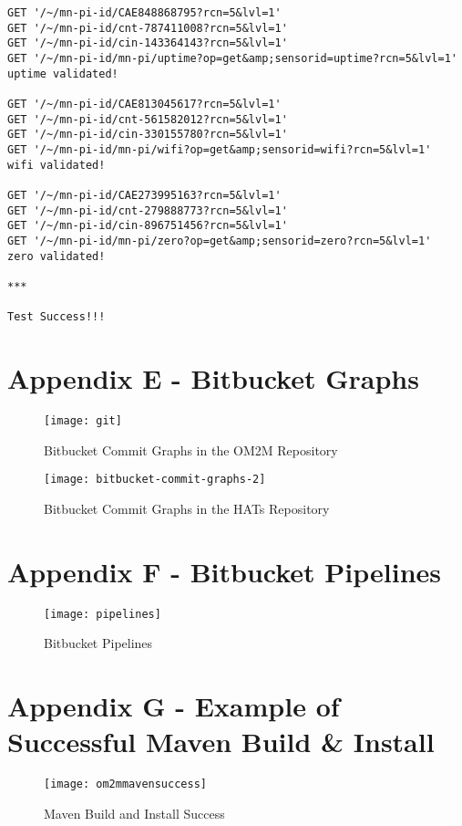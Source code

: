 \begin{lstlisting}
GET '/~/mn-pi-id/CAE848868795?rcn=5&lvl=1'
GET '/~/mn-pi-id/cnt-787411008?rcn=5&lvl=1'
GET '/~/mn-pi-id/cin-143364143?rcn=5&lvl=1'
GET '/~/mn-pi-id/mn-pi/uptime?op=get&amp;sensorid=uptime?rcn=5&lvl=1'
uptime validated!

GET '/~/mn-pi-id/CAE813045617?rcn=5&lvl=1'
GET '/~/mn-pi-id/cnt-561582012?rcn=5&lvl=1'
GET '/~/mn-pi-id/cin-330155780?rcn=5&lvl=1'
GET '/~/mn-pi-id/mn-pi/wifi?op=get&amp;sensorid=wifi?rcn=5&lvl=1'
wifi validated!

GET '/~/mn-pi-id/CAE273995163?rcn=5&lvl=1'
GET '/~/mn-pi-id/cnt-279888773?rcn=5&lvl=1'
GET '/~/mn-pi-id/cin-896751456?rcn=5&lvl=1'
GET '/~/mn-pi-id/mn-pi/zero?op=get&amp;sensorid=zero?rcn=5&lvl=1'
zero validated!

***

Test Success!!!
\end{lstlisting}

\section{Appendix E - Bitbucket Graphs}

\begin{figure}[H]
  \centering
  \texttt{[image: git]}
  \caption{Bitbucket Commit Graphs in the OM2M Repository}
  \label{bitbucket-commit-graphs}
\end{figure}

\begin{figure}[H]
  \centering
  \texttt{[image: bitbucket-commit-graphs-2]}
  \caption{Bitbucket Commit Graphs in the HATs Repository}
  \label{bitbucket-commit-graphs-2}
\end{figure}

\section{Appendix F - Bitbucket Pipelines}

\begin{figure}[H]
  \centering
  \texttt{[image: pipelines]}
  \caption{Bitbucket Pipelines}
  \label{bitbucket-pipelines}
\end{figure}

\section{Appendix G - Example of Successful Maven Build \& Install}

\begin{figure}[H]
  \centering
  \texttt{[image: om2mmavensuccess]}
  \caption{Maven Build and Install Success}
  \label{maven}
\end{figure}

